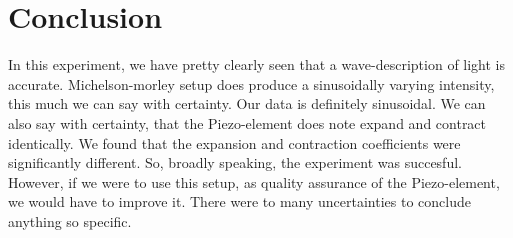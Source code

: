 \documentclass[working, oneside]{inputs/tuftebook}
\begin{document}
\section*{Conclusion}
In this experiment, we have pretty clearly seen that a wave-description of light is accurate. Michelson-morley setup does produce a sinusoidally varying intensity, this much we can say with certainty. Our data is definitely sinusoidal. We can also say with certainty, that the Piezo-element does note expand and contract identically. We found that the expansion and contraction coefficients were significantly different. So, broadly speaking, the experiment was succesful. However, if we were to use this setup, as quality assurance of the Piezo-element, we would have to improve it. There were to many uncertainties to conclude anything so specific.
\printbibliography
\end{document}
